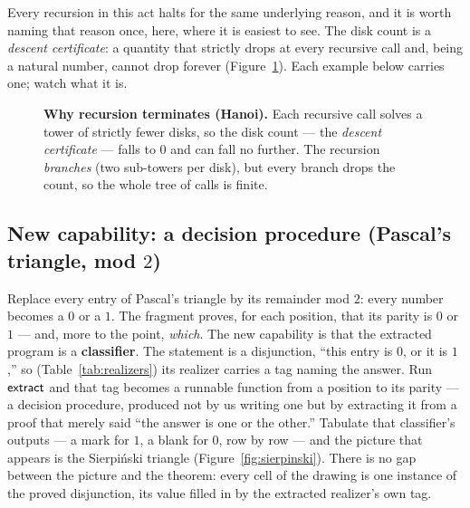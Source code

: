 \documentclass[11pt]{article}
\begin{document}
Every recursion in this act halts for the same underlying reason, and it is
worth naming that reason once, here, where it is easiest to see. The disk count
is a \emph{descent certificate}: a quantity that strictly drops at every
recursive call and, being a natural number, cannot drop forever
(Figure~\ref{fig:desc-hanoi}). Each example below carries one; watch what it is.

\begin{figure}[h]
\centering
{}
\caption{\textbf{Why recursion terminates (Hanoi).} Each recursive call solves a
tower of strictly fewer disks, so the disk count --- the \emph{descent
certificate} --- falls to $0$ and can fall no further. The recursion
\emph{branches} (two sub-towers per disk), but every branch drops the count, so
the whole tree of calls is finite.}
\label{fig:desc-hanoi}
\end{figure}

\subsection*{New capability: a decision procedure (Pascal's triangle, mod $2$)}

Replace every entry of Pascal's triangle by its remainder mod $2$: every number
becomes a $0$ or a $1$. The fragment proves, for each position, that its parity
is $0$ or $1$ --- and, more to the point, \emph{which}. The new capability is
that the extracted program is a \textbf{classifier}. The statement is a
disjunction, ``this entry is $0$, or it is $1$,'' so (Table~\ref{tab:realizers})
its realizer carries a tag naming the answer. Run $\mathsf{extract}$ and that tag
becomes a runnable function from a position to its parity --- a decision
procedure, produced not by us writing one but by extracting it from a proof
that merely said ``the answer is one or the other.'' Tabulate that classifier's
outputs --- a mark for $1$, a blank for $0$, row by row --- and the picture that
appears is the Sierpi\'nski triangle (Figure~\ref{fig:sierpinski}). There is no
gap between the picture and the theorem: every cell of the drawing is one
instance of the proved disjunction, its value filled in by the extracted
realizer's own tag.
\end{document}
